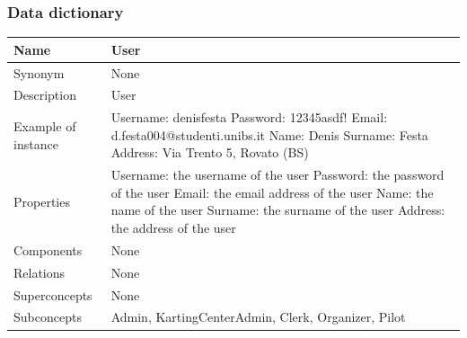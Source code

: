 \documentclass{beamer}
\begin{document}
\begin{frame}
    \frametitle{Data dictionary}
    \begin{table}
    \tiny
    \begin{tabular}{|p{2cm}|p{6cm}|}
    \hline
    Name & \textbf{User} \\
    \hline
    Synonym & None \\
    \hline
    Description & User \\
    \hline
    Example of instance &
    Username: denisfesta \newline
    Password: 12345asdf!  \newline
    Email: d.festa004@studenti.unibs.it \newline
    Name: Denis \newline
    Surname: Festa \newline
    Address: Via Trento 5, Rovato (BS) \\
    \hline
    Properties &
    Username: the username of the user \newline
    Password: the password of the user \newline
    Email: the email address of the user \newline
    Name: the name of the user \newline
    Surname: the surname of the user \newline
    Address: the address of the user \\
    \hline
    Components & None \\
    \hline
    Relations & None \\
    \hline
    Superconcepts & None \\
    \hline
    Subconcepts & Admin, KartingCenterAdmin, Clerk, Organizer, Pilot \\
    \hline
    \end{tabular}
    \end{table}
\end{frame}
\end{document}
